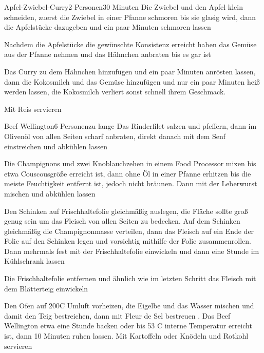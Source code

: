 

\begin{recipe}{Apfel-Zwiebel-Curry}{2 Personen}{30 Minuten}
Die Zwiebel und den Apfel klein schneiden, zuerst die Zwiebel in einer Pfanne schmoren bis sie glasig wird, dann die Apfelstücke dazugeben und ein paar Minuten schmoren lassen

Nachdem die Apfelstücke die gewünschte Konsistenz erreicht haben das Gemüse aus der Pfanne nehmen und das Hähnchen anbraten bis es gar ist

Das Curry zu dem Hähnchen hinzufügen und ein paar Minuten anrösten lassen, dann die Kokosmilch und das Gemüse hinzufügen und nur ein paar Minuten heiß werden lassen, die Kokosmilch verliert sonst schnell ihrem Geschmack.

Mit Reis servieren
\end{recipe}


\begin{recipe}{Beef Wellington}{6 Personen}{zu lange}
Das Rinderfilet salzen und pfeffern, dann im Olivenöl von allen Seiten scharf anbraten, direkt danach mit dem Senf einstreichen und abkühlen lassen

Die Champignons und zwei Knoblauchzehen in einem Food Processor mixen bis etwa Couscousgröße erreicht ist, dann ohne Öl in einer Pfanne erhitzen bis die meiste Feuchtigkeit entfernt ist, jedoch nicht bräunen. Dann mit der Leberwurst mischen und abkühlen lassen

Den Schinken auf Frischhaltefolie gleichmäßig auslegen, die Fläche sollte groß genug sein um das Fleisch von allen Seiten zu bedecken. Auf dem Schinken gleichmäßig die Champignonmasse verteilen, dann das Fleisch auf ein Ende der Folie auf den Schinken legen und vorsichtig mithilfe der Folie zusammenrollen. Dann mehrmals fest mit der Frischhaltefolie einwickeln und dann eine Stunde im Kühlschrank lassen

Die Frischhaltefolie entfernen und ähnlich wie im letzten Schritt das Fleisch mit dem Blätterteig einwickeln

Den Ofen auf 200\0C Umluft vorheizen, die Eigelbe und das Wasser mischen und damit den Teig bestreichen, dann mit Fleur de Sel bestreuen .
Das Beef Wellington etwa eine Stunde backen oder bis 53 C interne Temperatur erreicht ist, dann 10 Minuten ruhen lassen.
Mit Kartoffeln oder Knödeln und Rotkohl servieren

\end{recipe}

